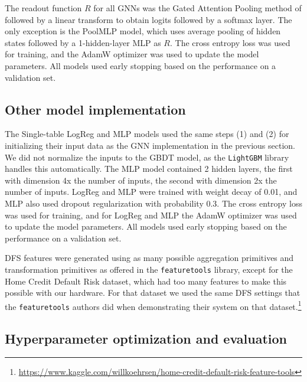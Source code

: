 \documentclass{article}
\begin{document}
The readout function $R$ for all GNNs was the Gated Attention Pooling method of \cite{ggnnpaper} followed by a linear transform to obtain logits followed by a softmax layer. The only exception is the PoolMLP model, which uses average pooling of hidden states followed by a 1-hidden-layer MLP as $R$.  The cross entropy loss was used for training, and the AdamW optimizer \citep{adamw} was used to update the model parameters.   All models used early stopping based on the performance on a validation set.

\subsection{Other model implementation}

The Single-table LogReg and MLP models used the same steps (1) and (2) for initializing their input data as the GNN implementation in the previous section.  We did not normalize the inputs to the GBDT model, as the \texttt{LightGBM} library handles this automatically.  The MLP model contained 2 hidden layers, the first with dimension 4x the number of inputs, the second with dimension 2x the number of inputs.  LogReg and MLP were trained with weight decay of 0.01, and MLP also used dropout regularization with probability 0.3.  The cross entropy loss was used for training, and for LogReg and MLP the AdamW optimizer \citep{adamw} was used to update the model parameters.   All models used early stopping based on the performance on a validation set.

DFS features were generated using as many possible aggregation primitives and transformation primitives as offered in the \texttt{featuretools} library, except for the Home Credit Default Risk dataset, which had too many features to make this possible with our hardware.  For that dataset we used the same DFS settings that the \texttt{featuretools} authors did when demonstrating their system on that dataset.\footnote{\url{https://www.kaggle.com/willkoehrsen/home-credit-default-risk-feature-tools}}

\subsection{Hyperparameter optimization and evaluation}
\end{document}
